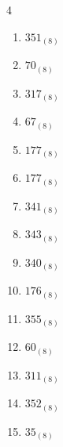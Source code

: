 \begin{multicols}{4}
\begin{enumerate}
        \phantom{$=60$}

\columnbreak %

  \item $351_{(8)}$

        \phantom{$=233$}

  \item $70_{(8)}$

        \phantom{$=56$}

  \item $317_{(8)}$

        \phantom{$=207$}

  \item $67_{(8)}$

        \phantom{$=55$}

  \item $177_{(8)}$

        \phantom{$=127$}

  \item $177_{(8)}$

        \phantom{$=127$}

  \item $341_{(8)}$

        \phantom{$=225$}

  \item $343_{(8)}$

        \phantom{$=227$}

  \item $340_{(8)}$

        \phantom{$=224$}

  \item $176_{(8)}$

        \phantom{$=126$}

  \item $355_{(8)}$

        \phantom{$=237$}

  \item $60_{(8)}$

        \phantom{$=48$}

  \item $311_{(8)}$

        \phantom{$=201$}

  \item $352_{(8)}$

        \phantom{$=234$}

  \item $35_{(8)}$

        \phantom{$=29$}


\end{enumerate}
\end{multicols}
